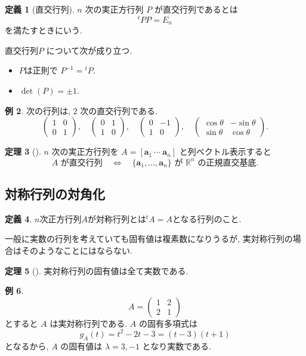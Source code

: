 \documentclass[dvipdfmx,a4paper,11pt]{article} %
\theoremstyle{definition}
\newtheorem{thm}{定理}[section]
\newtheorem{defn}[thm]{定義}
\newtheorem{eg}[thm]{例}
\begin{document}
\begin{defn}[直交行列]
\(n\) 次の実正方行列 \(P\) が直交行列であるとは
\[
{}^tPP=E_n
\]
を満たすときにいう.
\end{defn}

直交行列\(P\) について次が成り立つ. 
\begin{itemize}
\item $P$は正則で
\(
P^{-1}={}^tP
\).
\item \(
\det(P)=\pm1
\).
\end{itemize}


\begin{eg}
次の行列は, \(2\) 次の直交行列である.
\[
\begin{pmatrix}
1&0\\
0&1
\end{pmatrix},
\quad
\begin{pmatrix}
0&1\\
1&0
\end{pmatrix},
\quad
\begin{pmatrix}
0&-1\\
1&0
\end{pmatrix},
\quad
\begin{pmatrix}
\cos\theta&-\sin\theta\\
\sin\theta&\cos\theta
\end{pmatrix}.
\]
\end{eg}

\begin{thm}
[{\cite[定理6.2.5]{M}}]
\(n\) 次の実正方行列を
\(
A=[\bm{a}_1\ \cdots\ \bm{a}_n]
\)
と列ベクトル表示すると
\[
A\text{ が直交行列}
\quad\Longleftrightarrow\quad
\{\bm{a}_1,\ldots,\bm{a}_n\}\text{ が \(\mathbb{R}^n\) の正規直交基底}.
\]
\end{thm}


\subsection{対称行列の対角化 \cite[6.3節]{M}}

\begin{defn}
$n$次正方行列$A$が対称行列とは${}^tA =A$となる行列のこと. 
\end{defn}

一般に実数の行列を考えていても固有値は複素数になりうるが, 実対称行列の場合はそのようなことにはならない. 
\begin{thm}
[{\cite[定理6.3.1]{M}}]
実対称行列の固有値は全て実数である.
\end{thm}
\begin{eg}%
\[
A=
\begin{pmatrix}
1&2\\
2&1
\end{pmatrix}
\]
とすると \(A\) は実対称行列である. \(A\) の固有多項式は
\[
g_A(t)=t^2-2t-3=(t-3)(t+1)
\]
となるから, \(A\) の固有値は
\(
\lambda=3,-1
\)
となり実数である.
\end{eg}
\end{document}
